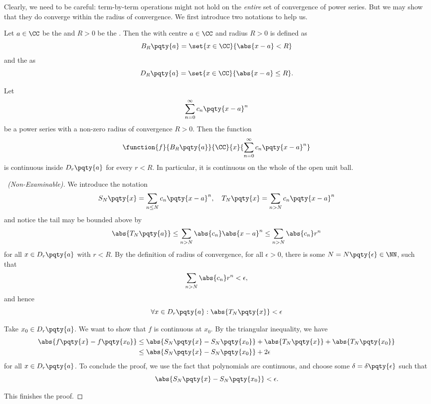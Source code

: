 Clearly, we need to be careful: term-by-term operations might not hold on the \emph{entire} set of convergence of power series. But we may show that they do converge within the radius of convergence. We first introduce two notations to help us. 

\begin{definition}
    \label{def:open-ball-closed-disk}%
    Let \(a \in \CC\) be the  and \(R > 0\) be the . Then the  with centre \(a \in \CC\) and radius \(R > 0\) is defined as
    \[
        B_R \pqty{a} = \set{x \in \CC}{\abs{x - a} < R}
    \]
    and the  as
    \[
        D_R \pqty{a} = \set{x \in \CC}{\abs{x - a} \leq R}.
    \]
\end{definition}

\begin{proposition}
    \label{prop:continuity-of-power-series}%
    Let
    \[
        \sum_{n = 0}^{\infty} c_n \pqty{x - a}^{n}
    \]
    be a power series with a non-zero radius of convergence \(R > 0\). Then the function
    \[
        \function{f}{B_R \pqty{a}}{\CC}{x}{\sum_{n = 0}^{\infty} c_n \pqty{x - a}^n}
    \]
    is continuous inside \(D_r\pqty{a}\) for every \(r < R\). In particular, it is continuous on the whole of the open unit ball.
\end{proposition}

\begin{proof}[\proofname\ (Non-Examinable)]
    We introduce the notation
    \[
        S_N\pqty{x} = \sum_{n \leq N} c_n \pqty{x - a}^n, \quad T_N\pqty{x} = \sum_{n > N} c_n \pqty{x - a}^n
    \]
    and notice the tail may be bounded above by
    \[
        \abs{T_N\pqty{a}} \leq \sum_{n > N} \abs{c_n} \abs{x - a}^n \leq \sum_{n > N} \abs{c_n} r^n
    \]
    for all \(x \in D_r\pqty{a}\) with \(r < R\). By the definition of radius of convergence, for all \(\epsilon > 0\), there is some \(N = N \pqty{\epsilon} \in \NN\), such that
    \[
        \sum_{n > N} \abs{c_n} r^n < \epsilon,
    \]
    and hence
    \[
        \forall x \in D_r\pqty{a}: \abs{T_N\pqty{x}} < \epsilon
    \]

    Take \(x_0 \in D_r\pqty{a}\). We want to show that \(f\) is continuous at \(x_0\). By the triangular inequality, we have
    \begin{align*}
        \abs{f\pqty{x} - f\pqty{x_0}} &\leq \abs{S_N\pqty{x} - S_N\pqty{x_0}} + \abs{T_N\pqty{x}} + \abs{T_N \pqty{x_0}} \\
        &\leq \abs{S_N\pqty{x} - S_N\pqty{x_0}} + 2 \epsilon
    \end{align*}
    for all \(x \in D_r\pqty{a}\). To conclude the proof, we use the fact that polynomials are continuous, and choose some \(\delta = \delta\pqty{\epsilon}\) such that
    \[
        \abs{S_N\pqty{x} - S_N\pqty{x_0}} < \epsilon.
    \]

    This finishes the proof.
\end{proof}

